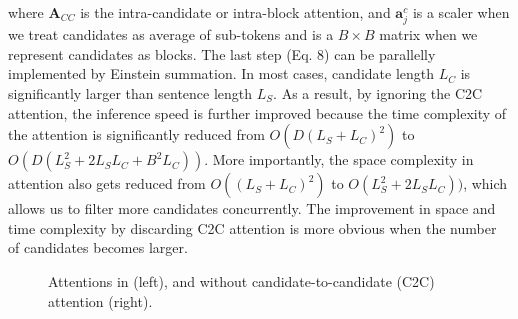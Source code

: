 where $\bm{A}_{CC}$ is the intra-candidate or intra-block attention, and $\bm{a}_j^c$ is a scaler when we treat candidates as average of sub-tokens and is a $B \times B$ matrix when we represent candidates as blocks. The last step (Eq. 8) can be parallelly implemented by Einstein summation.
In most cases, candidate length $L_C$ is significantly larger than sentence length $L_S$. As a result, by ignoring the C2C attention, the inference speed is further improved because the time complexity of the attention is significantly reduced from $O(D(L_S+L_C)^2)$ to $O(D(L_S^2+2L_SL_C+B^2L_C))$. More importantly, the space complexity in attention also gets reduced from $O((L_S+L_C)^2)$ to $O(L_S^2+2L_SL_C))$, which allows us to filter more candidates concurrently. The improvement in space and time complexity by discarding C2C attention is more obvious when the number of candidates becomes larger.

\begin{figure}[h]
    \centering
    \caption{Attentions in {\bf \textsc{\name}} (left), and {\bf \textsc{\name}}  without candidate-to-candidate (C2C) attention (right).}
    \label{fig:attn1}
\end{figure}